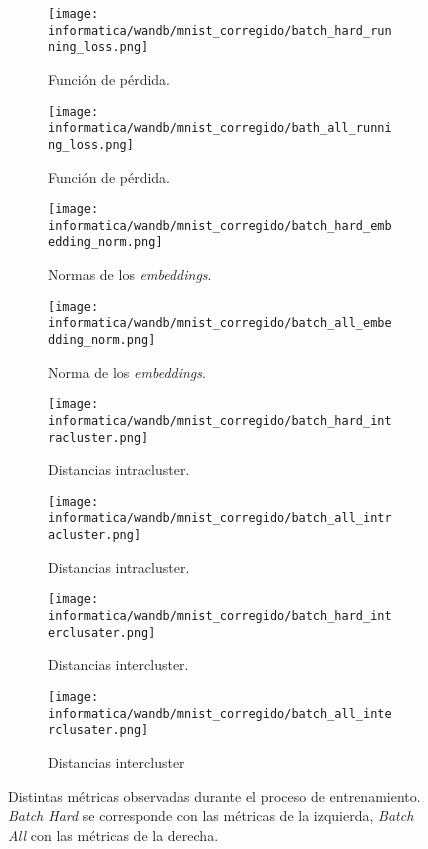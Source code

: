 \begin{figure}[!hbtp]
    \centering
    \begin{subfigure}{.5\textwidth}
        \centering
        \texttt{[image: informatica/wandb/mnist\_corregido/batch\_hard\_running\_loss.png]}
        \caption{Función de pérdida.}
    \end{subfigure}%
    \begin{subfigure}{.5\textwidth}
        \centering
        \texttt{[image: informatica/wandb/mnist\_corregido/bath\_all\_running\_loss.png]}
        \caption{Función de pérdida.}
    \end{subfigure}

    \begin{subfigure}{.5\textwidth}
        \centering
        \texttt{[image: informatica/wandb/mnist\_corregido/batch\_hard\_embedding\_norm.png]}
        \caption{Normas de los \textit{embeddings}.}
    \end{subfigure}%
    \begin{subfigure}{.5\textwidth}
        \centering
        \texttt{[image: informatica/wandb/mnist\_corregido/batch\_all\_embedding\_norm.png]}
        \caption{Norma de los \textit{embeddings}.}
    \end{subfigure}

    \begin{subfigure}{.5\textwidth}
        \centering
        \texttt{[image: informatica/wandb/mnist\_corregido/batch\_hard\_intracluster.png]}
        \caption{Distancias intracluster.}
    \end{subfigure}%
    \begin{subfigure}{.5\textwidth}
        \centering
        \texttt{[image: informatica/wandb/mnist\_corregido/batch\_all\_intracluster.png]}
        \caption{Distancias intracluster.}
    \end{subfigure}

    \begin{subfigure}{.5\textwidth}
        \centering
        \texttt{[image: informatica/wandb/mnist\_corregido/batch\_hard\_interclusater.png]}
        \caption{Distancias intercluster.}
    \end{subfigure}%
    \begin{subfigure}{.5\textwidth}
        \centering
        \texttt{[image: informatica/wandb/mnist\_corregido/batch\_all\_interclusater.png]}
        \caption{Distancias intercluster}
    \end{subfigure}

    \caption{Distintas métricas observadas durante el proceso de entrenamiento. \textit{Batch Hard} se corresponde con las métricas de la izquierda, \textit{Batch All} con las métricas de la derecha.}
    \label{img:procesos_entrenamiento_mnist_corregido}
\end{figure}

